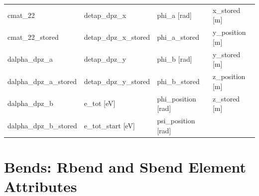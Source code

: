 \begin{tabular}{llll}
cmat_22                          & detap_dpz_x                      & phi_a [rad]                      & x_stored [m]                     \\
cmat_22_stored                   & detap_dpz_x_stored               & phi_a_stored                     & y_position [m]                   \\
dalpha_dpz_a                     & detap_dpz_y                      & phi_b [rad]                      & y_stored [m]                     \\
dalpha_dpz_a_stored              & detap_dpz_y_stored               & phi_b_stored                     & z_position [m]                   \\
dalpha_dpz_b                     & e_tot [eV]                       & phi_position [rad]               & z_stored [m]                     \\
dalpha_dpz_b_stored              & e_tot_start [eV]                 & psi_position [rad]               &                                  \\
 \bottomrule
 \end{tabular}
 \vfill
 
 \section{Bends: Rbend and Sbend Element Attributes}
 \label{s:list.bend}
 

